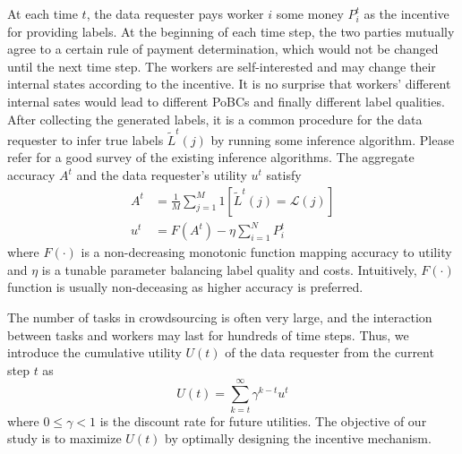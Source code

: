At each time $t$, the data requester pays worker $i$ some money $P^{t}_{i}$ as the incentive for providing labels.
At the beginning of each time step, the two parties mutually agree to a certain rule of payment determination, which would not be changed until the next time step.
The workers are self-interested and may change their internal states according to the incentive. It is no surprise that workers' different internal sates would lead to different PoBCs and finally different label qualities.
After collecting the generated labels, it is a common procedure for the data requester to infer true labels $\tilde{L}^t(j)$ by running some inference algorithm. Please refer \citet{zheng2017truth} for a good survey of the existing inference algorithms.
The aggregate accuracy $A^t$ and the data requester's utility $u^t$ satisfy
\begin{equation}
\label{equation:utility}
\begin{split}
A^t&=\frac{1}{M}{\sum}_{j=1}^{M}1\left[\tilde{L}^{t}(j)=\mathcal{L}(j)\right]\\
u^t &= F(A^t) - \eta {\sum}_{i=1}^{N}P^t_i
\end{split}
\end{equation}
where $F(\cdot)$ is a non-decreasing monotonic function mapping accuracy to utility and $\eta$ is a
tunable parameter balancing label quality and costs. Intuitively, $F(\cdot)$ function is usually non-deceasing as higher accuracy is preferred.

The number of tasks in crowdsourcing is often very large, and the interaction between tasks and workers may last for hundreds of time steps.
Thus, we introduce the cumulative utility $U(t)$ of the data requester from the current step $t$ as
\begin{equation}
U(t)={\sum}_{k=t}^{\infty}\gamma^{k-t}u^t
\end{equation}
where $0\leq \gamma< 1$ is the discount rate for future utilities.
The objective of our study is to maximize $U(t)$ by optimally designing %
the incentive mechanism.